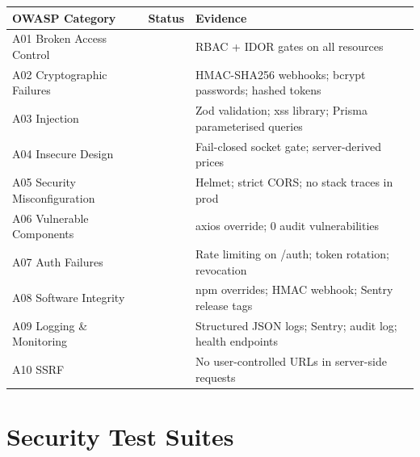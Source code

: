 \documentclass[11pt,a4paper,twoside]{book}
\newcommand{\th}[1]{\textbf{\color{white}#1}}
\newcommand{\yes}{\textcolor{ok}{\faCheckCircle}}
\begin{document}
\begin{center}\small
\begin{tabular}{p{4.5cm}lp{6cm}}
\toprule
\rowcolor{headbg}\th{OWASP Category} & \th{Status} & \th{Evidence} \\
\midrule
A01 Broken Access Control     & \yes{} & RBAC + IDOR gates on all resources \\
\rowcolor{rowalt}A02 Cryptographic Failures  & \yes{} & HMAC-SHA256 webhooks; bcrypt passwords; hashed tokens \\
A03 Injection                 & \yes{} & Zod validation; xss library; Prisma parameterised queries \\
\rowcolor{rowalt}A04 Insecure Design         & \yes{} & Fail-closed socket gate; server-derived prices \\
A05 Security Misconfiguration & \yes{} & Helmet; strict CORS; no stack traces in prod \\
\rowcolor{rowalt}A06 Vulnerable Components   & \yes{} & axios override; 0 audit vulnerabilities \\
A07 Auth Failures             & \yes{} & Rate limiting on /auth; token rotation; revocation \\
\rowcolor{rowalt}A08 Software Integrity      & \yes{} & npm overrides; HMAC webhook; Sentry release tags \\
A09 Logging \& Monitoring     & \yes{} & Structured JSON logs; Sentry; audit log; health endpoints \\
\rowcolor{rowalt}A10 SSRF                   & \yes{} & No user-controlled URLs in server-side requests \\
\bottomrule
\end{tabular}
\end{center}

\section{Security Test Suites}
\end{document}
